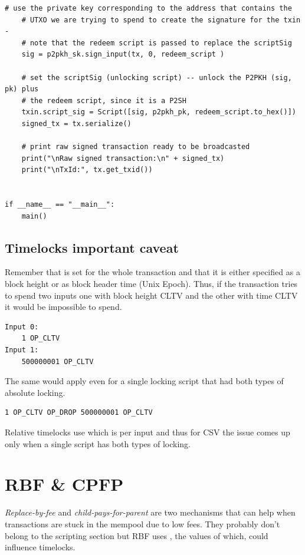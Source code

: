 \begin{lstlisting}[style=Python]
    # use the private key corresponding to the address that contains the
    # UTXO we are trying to spend to create the signature for the txin -
    # note that the redeem script is passed to replace the scriptSig
    sig = p2pkh_sk.sign_input(tx, 0, redeem_script )

    # set the scriptSig (unlocking script) -- unlock the P2PKH (sig, pk) plus
    # the redeem script, since it is a P2SH
    txin.script_sig = Script([sig, p2pkh_pk, redeem_script.to_hex()])
    signed_tx = tx.serialize()

    # print raw signed transaction ready to be broadcasted
    print("\nRaw signed transaction:\n" + signed_tx)
    print("\nTxId:", tx.get_txid())


if __name__ == "__main__":
    main()
\end{lstlisting}
\vspace{1em}


\subsection*{Timelocks important caveat}
\label{ssec:timelocks-important-caveat}
Remember that  is set for the whole transaction and that it is either specified as a block height or as block header time (Unix Epoch). Thus, if the transaction tries to spend two inputs one with block height CLTV and the other with time CLTV it would be impossible to spend. 
\begin{emphbox}
\begin{lstlisting}[style=Pseudomath]
Input 0:
	1 OP_CLTV
Input 1:
	500000001 OP_CLTV
\end{lstlisting}
\end{emphbox}

The same would apply even for a single locking script that had both types of absolute locking.

\begin{emphbox}
\begin{lstlisting}[style=Pseudomath]
1 OP_CLTV OP_DROP 500000001 OP_CLTV
\end{lstlisting}
\end{emphbox}

Relative timelocks use  which is per input and thus for CSV the issue comes up only when a single script has both types of locking.



\section{RBF \& CPFP}
\emph{Replace-by-fee} and \emph{child-pays-for-parent} are two mechanisms that can help when transactions are stuck in the mempool due to low fees. They probably don't belong to the scripting section but RBF uses , the values of which, could influence timelocks. 

